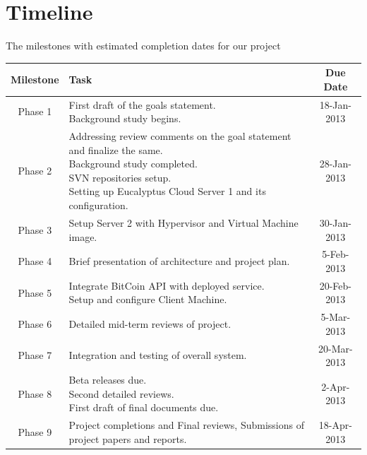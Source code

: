 \documentclass[a4page,12pt]{article}
\begin{document}
\section{Timeline}
The milestones with estimated completion dates for our project
\begin{table}[h]
\begin{tabular}{|c|p{8cm}|c|}
\hline 
Milestone & Task & Due Date \tabularnewline
\hline
\hline
Phase 1 & \parbox{8cm}{ First draft of the goals statement.\\
Background study begins.}& 18-Jan-2013
\tabularnewline
\hline
Phase 2 & \parbox{8cm}{ Addressing review comments on the  goal statement and finalize the same.\\
Background study completed.\\
SVN repositories setup.\\
Setting up Eucalyptus Cloud Server 1 and its configuration.
} & 28-Jan-2013
\tabularnewline
\hline
Phase 3 & \parbox{8cm}{ Setup Server 2 with Hypervisor and Virtual Machine image.} & 30-Jan-2013
\tabularnewline
\hline
Phase 4  & 
\parbox{8cm}{ Brief presentation of architecture and project plan.}
&  5-Feb-2013
\tabularnewline
\hline 
Phase 5 & \parbox{8cm}{Integrate BitCoin API with deployed service.\\
Setup and configure Client Machine.}
 & 20-Feb-2013
\tabularnewline
\hline 
Phase 6 & Detailed mid-term reviews of project. & 5-Mar-2013
\tabularnewline
\hline 
Phase 7 & Integration and testing of overall system. & 20-Mar-2013
\tabularnewline
\hline 
Phase 8 & \parbox{8cm}{Beta releases due.\\
Second detailed reviews.\\
First draft of final documents due.\\ }&2-Apr-2013
\tabularnewline
\hline 
Phase 9 & Project completions and Final reviews, Submissions of project papers and reports.  & 18-Apr-2013
\tabularnewline
\hline 
\end{tabular}
\end{table}
\pagebreak
\end{document}

